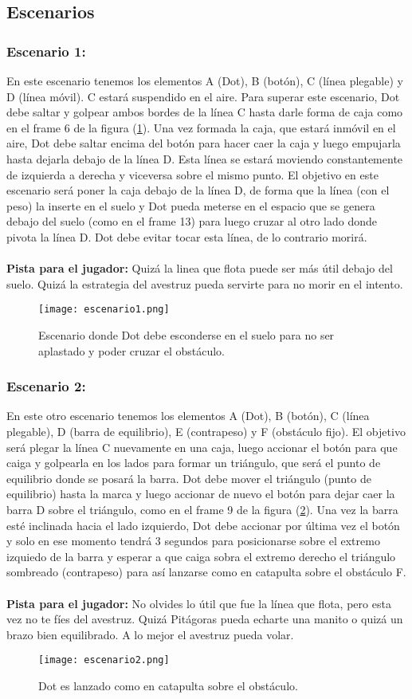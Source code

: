 \documentclass{article}
\begin{document}
\subsection{Escenarios}
\subsubsection{Escenario 1: } \label{EarthOrbit}
En este escenario tenemos los elementos A (Dot), B (botón), C (línea plegable) y D (línea móvil). C estará suspendido en el aire. Para superar este escenario, Dot debe saltar y golpear ambos bordes de la línea C hasta darle forma de caja como en el frame 6 de la figura (\ref{fig:escenario1}). Una vez formada la caja, que estará inmóvil en el aire, Dot debe saltar encima del botón para hacer caer la caja y luego empujarla hasta dejarla debajo de la línea D. Esta línea se estará moviendo constantemente de izquierda a derecha y viceversa sobre el mismo punto. El objetivo en este escenario será poner la caja debajo de la línea D, de forma que la línea (con el peso) la inserte en el suelo y Dot pueda meterse en el espacio que se genera debajo del suelo (como en el frame 13) para luego cruzar al otro lado donde pivota la línea D. Dot debe evitar tocar esta línea, de lo contrario morirá.
\\\\
\textbf{Pista para el jugador: }Quizá la linea que flota puede ser más útil debajo del suelo. Quizá la estrategia del avestruz pueda servirte para no morir en el intento.

\begin{figure}[h]
\texttt{[image: escenario1.png]}
\centering
\caption{ Escenario donde Dot debe esconderse en el suelo para no ser aplastado y poder cruzar el obstáculo. }
\label{fig:escenario1}
\end{figure}
\subsubsection{Escenario 2:}
En este otro escenario tenemos los elementos A (Dot), B (botón), C (línea plegable), D (barra de equilibrio), E (contrapeso) y F (obstáculo fijo). El objetivo será plegar la línea C nuevamente en una caja, luego accionar el botón para que caiga y golpearla en los lados para formar un triángulo, que será el punto de equilibrio donde se posará la barra. Dot debe mover el triángulo (punto de equilibrio) hasta la marca y luego accionar de nuevo el botón para dejar caer la barra D sobre el triángulo, como en el frame 9 de la figura (\ref{fig:escenario2}). Una vez la barra esté inclinada hacia el lado izquierdo, Dot debe accionar por última vez el botón y solo en ese momento tendrá 3 segundos para posicionarse sobre el extremo izquiedo de la barra y esperar a que caiga sobra el extremo derecho el triángulo sombreado (contrapeso) para así lanzarse como en catapulta sobre el obstáculo F.
\\\\
\textbf{Pista para el jugador: } No olvides lo útil que fue la línea que flota, pero esta vez no te fíes del avestruz. Quizá Pitágoras pueda echarte una manito o quizá un brazo bien equilibrado. A lo mejor el avestruz pueda volar.

\begin{figure}[h]
\texttt{[image: escenario2.png]}
\centering
\caption{Dot es lanzado como en catapulta sobre el obstáculo.}
\label{fig:escenario2}
\end{figure}


\clearpage


\end{document}
